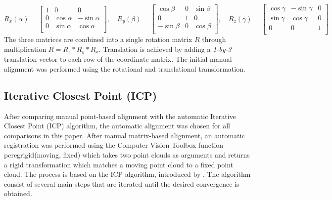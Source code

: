 \documentclass[a4paper]{article}
\begin{document}
\begin{equation}
R_x(\alpha) = \begin{bmatrix}
1 & 0 & 0 \\
0 & \cos \alpha &  -\sin \alpha \\[3pt]
0 & \sin \alpha  &  \cos \alpha \\[3pt]
\end{bmatrix}, \quad
R_y(\beta) = \begin{bmatrix}
\cos \beta & 0 & \sin \beta \\[3pt]
0 & 1 & 0 \\[3pt]
-\sin \beta & 0 & \cos \beta \\
\end{bmatrix}, \quad
R_z(\gamma) = \begin{bmatrix}
\cos \gamma &  -\sin \gamma & 0 \\[3pt]
\sin \gamma & \cos \gamma & 0\\[3pt]
0 & 0 & 1\\
\end{bmatrix}
\end{equation}
The three matrices are combined into a single rotation matrix $R$ through multiplication $R = R_z*R_y*R_x$.  Translation is achieved by adding a \emph{1-by-3} translation vector to each row of the coordinate matrix. The initial manual alignment was performed using the rotational and translational transformation. 


\subsection{Iterative Closest Point (ICP)} %
After comparing manual point-based alignment with the automatic Iterative Closest Point (ICP) algorithm, the automatic alignment was chosen for all comparisons in this paper. After manual matrix-based alignment, an automatic registration was performed using the Computer Vision Toolbox function {\selectfont pcregrigid(moving, fixed)} which takes two point clouds as arguments and returns a rigid transformation which matches a moving point cloud to a fixed point cloud. The process is based on the ICP algorithm, introduced by \cite{121791}. The algorithm consist of several main steps that are iterated until the desired convergence is obtained. 
\end{document}
